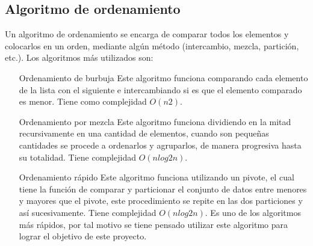 \documentclass[9pt,draft,a4paper,twoside,onecolumn,romanappendices]{IEEEtran}\usepackage[]{graphicx}\usepackage[]{color}
\theoremstyle{definition}
\begin{document}
\subsection{Algoritmo de ordenamiento}

Un algoritmo de ordenamiento se encarga de comparar todos los elementos y colocarlos en un orden, mediante algún método (intercambio, mezcla, partición, etc.). Los algoritmos más utilizados son: %

\begin{itemize}
\item[Ordenamiento de burbuja] Este algoritmo funciona comparando cada elemento de la lista con el siguiente e intercambiando si es que el elemento comparado es menor. Tiene como complejidad $O(n2)$.

\item[Ordenamiento por mezcla] Este algoritmo funciona dividiendo en la mitad recursivamente en una cantidad de elementos, cuando son pequeñas cantidades se procede a ordenarlos y agruparlos, de manera progresiva hasta su totalidad. Tiene complejidad $O(nlog2n)$.

\item[Ordenamiento rápido] Este algoritmo funciona utilizando un pivote, el cual tiene la función de comparar y particionar el conjunto de datos entre menores y mayores que el pivote, este procedimiento se repite en las dos particiones y así sucesivamente. Tiene complejidad $O(nlog2n)$. Es uno de los algoritmos más rápidos, por tal motivo se tiene pensado utilizar este algoritmo para lograr el objetivo de este proyecto.
\end{itemize}
\end{document}
